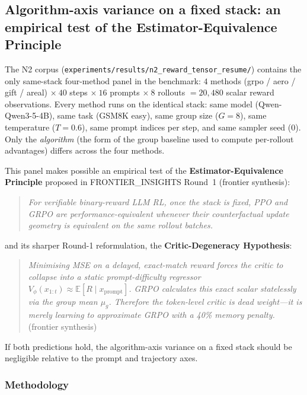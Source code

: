 
\subsection{Algorithm-axis variance on a fixed stack: an empirical test of the
Estimator-Equivalence Principle}
\label{sec:p5-iter141-algo-axis}

The N2 corpus
(\texttt{experiments/results/n2\_reward\_tensor\_resume/}) contains the only
same-stack four-method panel in the benchmark:
$4$ methods (grpo / aero / gift / areal)
$\times\ 40$ steps
$\times\ 16$ prompts
$\times\ 8$ rollouts $= 20{,}480$ scalar reward observations.
Every method runs on the identical stack: same model
(Qwen-Qwen3-5-4B), same task (GSM8K easy), same group size ($G = 8$), same
temperature ($T = 0.6$), same prompt indices per step, and same sampler
seed ($0$). Only the \emph{algorithm} (the form of the group baseline used
to compute per-rollout advantages) differs across the four methods.

This panel makes possible an empirical test of the
\textbf{Estimator-Equivalence Principle} proposed in
FRONTIER\_INSIGHTS Round~1 (frontier synthesis):

\begin{quote}
\emph{For verifiable binary-reward LLM RL, once the stack is fixed, PPO and
GRPO are performance-equivalent whenever their counterfactual update
geometry is equivalent on the same rollout batches.}
\end{quote}

\noindent and its sharper Round-1 reformulation, the
\textbf{Critic-Degeneracy Hypothesis}:

\begin{quote}
\emph{Minimising MSE on a delayed, exact-match reward forces the critic to
collapse into a static prompt-difficulty regressor
$V_\phi(x_{1:t}) \approx \mathbb{E}[R \mid x_{\text{prompt}}]$. GRPO
calculates this exact scalar statelessly via the group mean $\mu_g$.
Therefore the token-level critic is dead weight---it is merely learning to
approximate GRPO with a 40\% memory penalty.} (frontier synthesis)
\end{quote}

If both predictions hold, the algorithm-axis variance on a fixed stack
should be negligible relative to the prompt and trajectory axes.

\subsubsection{Methodology}

